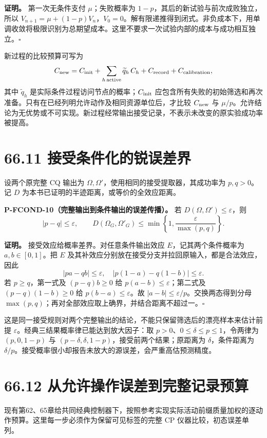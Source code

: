 \documentclass[
  11pt,
  oneside]{book}
\begin{document}
\textbf{证明。} 第一次无条件支付 \(\mu\)；失败概率为
\(1-p\)，其后的新试验与前次成败独立，所以
\(V_{n+1}=\mu+(1-p)V_n\)，\(V_0=0\)。解有限递推得到闭式。非负成本下，用单调收敛将极限识别为总期望成本。这里不要求一次试验内部的成本与成功相互独立。\(\square\)

新过程的比较预算可写为 \[
C_{\rm new}=C_{\rm init}+\sum_{h\,\mathrm{active}}
 \widetilde q_h\,C_h+C_{\rm record}+C_{\rm calibration},
\] 其中 \(\widetilde q_h\)
是实际条件过程访问节点的概率；\(C_{\rm init}\)
应包含所有失败的初始筛选和再次准备。只有在已经列明允许动作及相同资源单位后，才比较
\(C_{\rm new}\) 与
\(\mu/p\)。允许结论为无优势或不可实现。新过程经常输出接受记录，不表示未改变的原实验成功率被提高。

\section{66.11 接受条件化的锐误差界}

设两个原完整 CQ 输出为
\(\Omega,\Omega'\)，使用相同的接受提取器，其成功率为 \(p,q>0\)。记 \(D\)
为本书已证明的半迹距离，或等价的全效应距离。

\protect\hypertarget{p-fcond-10}{}{}
\textbf{P-FCOND-10（完整输出到条件输出的误差传播）。} 若
\(D(\Omega,\Omega')\le\varepsilon\)，则 \[
|p-q|\le\varepsilon,\qquad
D(\Omega_G,\Omega'_G)\le
\min\left\{1,\frac{\varepsilon}{\max(p,q)}\right\}.
\]

\textbf{证明。} 接受效应给概率差界。对任意条件输出效应
\(E\)，记其两个条件概率为 \(a,b\in[0,1]\)。把 \(E\)
及其补效应分别放在接受分支并拉回原输入，都是合法效应，因此 \[
|pa-qb|\le\varepsilon,\quad
|p(1-a)-q(1-b)|\le\varepsilon.
\] 若 \(p\ge q\)，第一式及 \((p-q)b\ge0\) 给
\(p(a-b)\le\varepsilon\)；第二式及 \((p-q)(1-b)\ge0\) 给
\(p(b-a)\le\varepsilon\)。故 \(|a-b|\le\varepsilon/p\)。交换两态得到分母
\(\max(p,q)\)；再对全部效应取上确界，并结合距离不超过一。\(\square\)

这是同一接受规则对两个完整输出的结论，不能只保留筛选后的漂亮样本来估计前提
\(\varepsilon\)。经典三结果概率律已能达到放大因子：取
\(p>0\)、\(0\le\delta\le p\le1\)，令两律为 \((p,0,1-p)\) 与
\((p-\delta,\delta,1-p)\)，接受前两个结果；原距离为
\(\delta\)，条件距离为
\(\delta/p\)。接受概率很小却报告未放大的源误差，会严重高估预测精度。

\section{66.12 从允许操作误差到完整记录预算}

现有第62、65章给共同经典控制器下，按照参考实现实际活动前缀质量加权的逐动作预算。这里每一步必须作为保留可见标签的完整
CP 仪器比较，初态误差单列。
\end{document}
